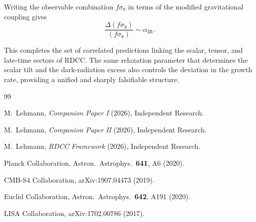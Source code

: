 \documentclass[11pt,a4paper]{article}
\begin{document}
Writing the observable combination $f\sigma_8$ in terms of the modified gravitational
coupling gives
\begin{equation}
    \frac{\Delta(f\sigma_8)}{(f\sigma_8)}
    \sim \alpha_{\mathrm{IR}}.
\end{equation}

This completes the set of correlated predictions linking the scalar, tensor, and
late-time sectors of RDCC. The same relaxation parameter that determines the scalar
tilt and the dark-radiation excess also controls the deviation in the growth rate,
providing a unified and sharply falsifiable structure.

\begin{thebibliography}{99}

M.~Lehmann,
\textit{Companion Paper I} (2026), Independent Research.

M.~Lehmann,
\textit{Companion Paper II} (2026), Independent Research.

M.~Lehmann,
\textit{RDCC Framework} (2026), Independent Research.

Planck Collaboration,
Astron.\ Astrophys.\ \textbf{641}, A6 (2020).

CMB-S4 Collaboration,
arXiv:1907.04473 (2019).

Euclid Collaboration,
Astron.\ Astrophys.\ \textbf{642}, A191 (2020).

LISA Collaboration,
arXiv:1702.00786 (2017).

\end{thebibliography}
\end{document}
